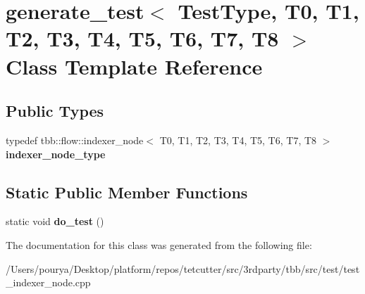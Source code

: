 \hypertarget{classgenerate__test_3_01TestType_00_01T0_00_01T1_00_01T2_00_01T3_00_01T4_00_01T5_00_01T6_00_01T7_00_01T8_01_4}{}\section{generate\+\_\+test$<$ Test\+Type, T0, T1, T2, T3, T4, T5, T6, T7, T8 $>$ Class Template Reference}
\label{classgenerate__test_3_01TestType_00_01T0_00_01T1_00_01T2_00_01T3_00_01T4_00_01T5_00_01T6_00_01T7_00_01T8_01_4}
\subsection*{Public Types}
\begin{DoxyCompactItemize}
\item 
\hypertarget{classgenerate__test_3_01TestType_00_01T0_00_01T1_00_01T2_00_01T3_00_01T4_00_01T5_00_01T6_00_01T7_00_01T8_01_4_ac09e02cf92e1b9e415f84b990a234287}{}typedef tbb\+::flow\+::indexer\+\_\+node$<$ T0, T1, T2, T3, T4, T5, T6, T7, T8 $>$ {\bfseries indexer\+\_\+node\+\_\+type}\label{classgenerate__test_3_01TestType_00_01T0_00_01T1_00_01T2_00_01T3_00_01T4_00_01T5_00_01T6_00_01T7_00_01T8_01_4_ac09e02cf92e1b9e415f84b990a234287}

\end{DoxyCompactItemize}
\subsection*{Static Public Member Functions}
\begin{DoxyCompactItemize}
\item 
\hypertarget{classgenerate__test_3_01TestType_00_01T0_00_01T1_00_01T2_00_01T3_00_01T4_00_01T5_00_01T6_00_01T7_00_01T8_01_4_a68df28a5af1de24ec4d88dcf345bc8d0}{}static void {\bfseries do\+\_\+test} ()\label{classgenerate__test_3_01TestType_00_01T0_00_01T1_00_01T2_00_01T3_00_01T4_00_01T5_00_01T6_00_01T7_00_01T8_01_4_a68df28a5af1de24ec4d88dcf345bc8d0}

\end{DoxyCompactItemize}


The documentation for this class was generated from the following file\+:\begin{DoxyCompactItemize}
\item 
/\+Users/pourya/\+Desktop/platform/repos/tetcutter/src/3rdparty/tbb/src/test/test\+\_\+indexer\+\_\+node.\+cpp\end{DoxyCompactItemize}

